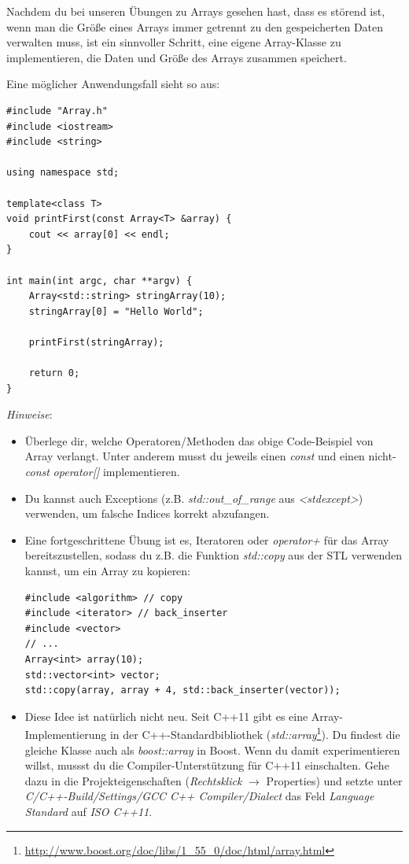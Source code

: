 Nachdem du bei unseren Übungen zu Arrays gesehen hast, dass es störend ist, wenn man die Größe eines Arrays immer getrennt zu den gespeicherten Daten verwalten muss, ist ein sinnvoller Schritt, eine eigene Array-Klasse zu implementieren, die Daten und Größe des Arrays zusammen speichert.

Eine möglicher Anwendungsfall sieht so aus:

\begin{lstlisting}
#include "Array.h"
#include <iostream>
#include <string>

using namespace std;

template<class T>
void printFirst(const Array<T> &array) {
    cout << array[0] << endl;
}

int main(int argc, char **argv) {
    Array<std::string> stringArray(10);
    stringArray[0] = "Hello World";

    printFirst(stringArray);

    return 0;
}
\end{lstlisting}

\emph{Hinweise}:
\begin{itemize}
\item
Überlege dir, welche Operatoren/Methoden das obige Code-Beispiel von Array verlangt.
Unter anderem musst du jeweils einen \emph{const} und einen nicht-\emph{const} \emph{operator[]} implementieren.

\item
Du kannst auch Exceptions (z.B. \emph{std::out\_of\_range} aus \emph{<stdexcept>}) verwenden, um falsche Indices korrekt abzufangen.

\item
Eine fortgeschrittene Übung ist es, Iteratoren oder \emph{operator+} für das Array bereitszustellen, sodass du z.B. die Funktion \emph{std::copy} aus der STL verwenden kannst, um ein Array zu kopieren:
\begin{lstlisting}
#include <algorithm> // copy
#include <iterator> // back_inserter
#include <vector>
// ...
Array<int> array(10);
std::vector<int> vector;
std::copy(array, array + 4, std::back_inserter(vector));
\end{lstlisting}

\item
Diese Idee ist natürlich nicht neu.
Seit C++11 gibt es eine Array-Implementierung in der C++-Standardbibliothek (\emph{std::array}\footnote{\url{http://www.boost.org/doc/libs/1_55_0/doc/html/array.html}}).
Du findest die gleiche Klasse auch als \emph{boost::array} in Boost.
Wenn du damit experimentieren willst, mussst du die Compiler-Unterstützung für C++11 einschalten.
Gehe dazu in die Projekteigenschaften (\emph{Rechtsklick} $\to$ Properties) und setzte unter \emph{C/C++-Build/Settings/GCC C++ Compiler/Dialect} das Feld \emph{Language Standard} auf \emph{ISO C++11}.
\end{itemize}




